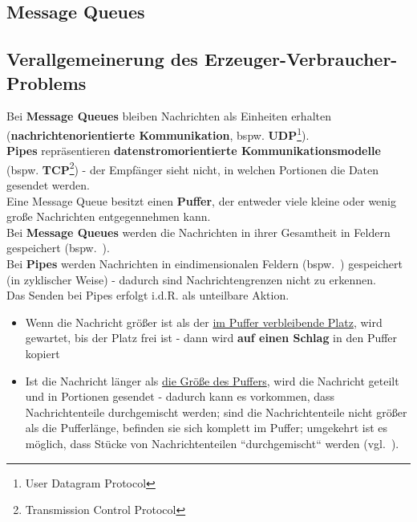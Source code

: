 \subsection{Message Queues}\label{sec:messagequeues}

\subsection{Verallgemeinerung des Erzeuger-Verbraucher-Problems}

Bei \textbf{Message Queues} bleiben Nachrichten als Einheiten erhalten (\textbf{nachrichtenorientierte Kommunikation}, bspw. \textbf{UDP}\footnote{User Datagram Protocol}).\\

\noindent
\textbf{Pipes} repräsentieren \textbf{datenstromorientierte Kommunikationsmodelle} (bspw. \textbf{TCP}\footnote{Transmission Control Protocol})  - der Empfänger sieht nicht, in welchen Portionen die Daten gesendet werden.\\

\noindent
Eine Message Queue besitzt einen \textbf{Puffer}, der entweder viele kleine oder wenig große Nachrichten entgegennehmen kann.\\

\noindent
Bei \textbf{Message Queues} werden die Nachrichten in ihrer Gesamtheit in Feldern gespeichert (bspw.~).\\

\noindent
Bei \textbf{Pipes} werden Nachrichten in eindimensionalen Feldern (bspw.~) gespeichert (in zyklischer Weise) - dadurch sind Nachrichtengrenzen nicht zu erkennen.\\

\noindent
Das Senden bei Pipes erfolgt i.d.R. als unteilbare Aktion.
\begin{itemize}
    \item Wenn die Nachricht größer ist als der \ul{im Puffer verbleibende Platz}, wird gewartet, bis der Platz frei ist - dann wird \textbf{auf einen Schlag} in den Puffer kopiert
    \item Ist die Nachricht länger als \ul{die Größe des Puffers}, wird die Nachricht geteilt und in Portionen gesendet - dadurch kann es vorkommen, dass Nachrichtenteile durchgemischt werden; sind die Nachrichtenteile nicht größer als die Pufferlänge, befinden sie sich komplett im Puffer;  umgekehrt ist es möglich, dass Stücke von Nachrichtenteilen ``durchgemischt`` werden (vgl.~\cite[117 f.]{Oec22}).
\end{itemize}


